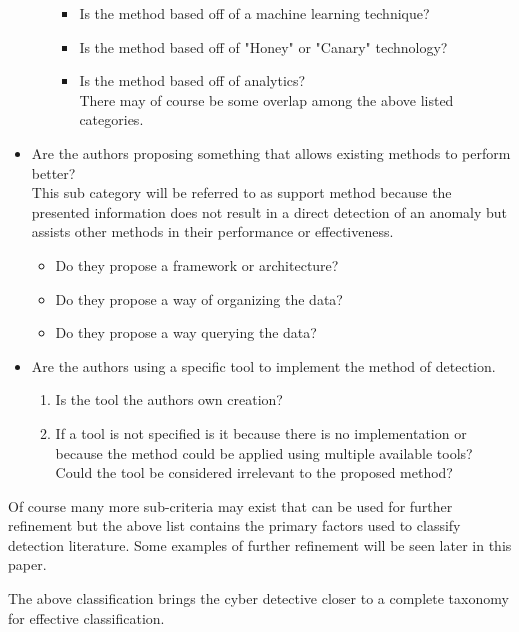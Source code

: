 \begin{itemize}
\begin{itemize}
            \begin{itemize}
                \item Is the method based off of a machine learning technique?
                \item Is the method based off of "Honey" or "Canary" technology?
                \item Is the method based off of analytics?\\
            There may of course be some overlap among the above listed categories.
            \end{itemize}
        \end{itemize}
    \item Are the authors proposing something that allows existing methods to perform better?\\
    This sub category will be referred to as support method because the presented information does not result in a direct detection of an anomaly but assists other methods in their performance or effectiveness.
    \begin{itemize}
        \item Do they propose a framework or architecture?
        \item Do they propose a way of organizing the data?
        \item Do they propose a way querying the data?
    \end{itemize}
    \item Are the authors using a specific tool to implement the method of detection.
    \begin{enumerate}
        \item Is the tool the authors own creation? 
        \item If a tool is not specified is it because there is no implementation or because the method could be applied using multiple available tools? Could the tool be considered irrelevant to the proposed method?
    \end{enumerate}
\end{itemize}
Of course many more sub-criteria may exist that can be used for further refinement but the above list contains the primary factors used to classify detection literature. 
Some examples of further refinement will be seen later in this paper.

The above classification brings the cyber detective closer to a complete taxonomy for effective classification.